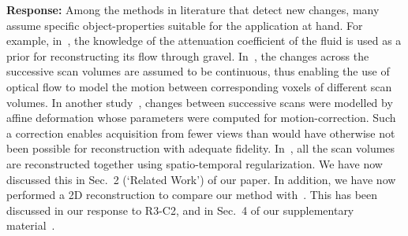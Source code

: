 \documentclass{article}
\begin{document}
\textbf{Response:} Among the methods in literature that detect new changes, many assume specific object-properties suitable for the application at hand.  For example, in~\cite{Van2015}, the knowledge of the attenuation coefficient of the fluid is used as a prior for reconstructing its flow through gravel. In~\cite{koen2020}, the changes across the successive scan volumes are assumed to be continuous, thus enabling the use of optical flow to model the motion between corresponding voxels of different scan volumes. In another study~\cite{vincent2017}, changes between successive scans were modelled by affine deformation whose parameters were computed for motion-correction. Such a correction enables acquisition from fewer views than would have otherwise not been possible for reconstruction with adequate fidelity. In~\cite{daniil2015}, all the scan volumes are reconstructed together using spatio-temporal regularization. We have now discussed this in Sec.~2 (`Related Work') of our paper.
In addition, we have now performed a 2D reconstruction to compare our method with~\cite{Lee2012}. This has been discussed in our response to R3-C2, and in Sec.~4 of our supplementary material~\cite{supp_paper}.\\


\end{document}
